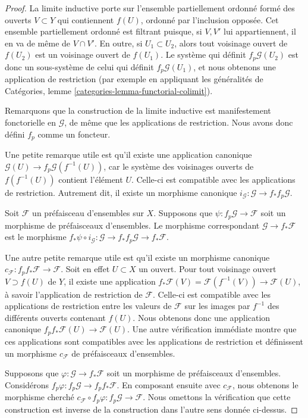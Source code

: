 \begin{proof}
La limite inductive porte sur l'ensemble partiellement ordonné formé des ouverts
$V \subset Y$ qui contiennent $f(U)$, ordonné par l'inclusion opposée.
Cet ensemble partiellement ordonné est filtrant puisque, si $V, V'$ lui appartiennent,
il en va de même de $V \cap V'$. En outre, si
$U_1 \subset U_2$, alors tout voisinage ouvert de $f(U_2)$
est un voisinage ouvert de $f(U_1)$. Le système qui définit
$f_p\mathcal{G}(U_2)$ est donc un sous-système de celui qui définit
$f_p\mathcal{G}(U_1)$, et nous obtenons une application de restriction (par
exemple en appliquant les généralités de Catégories,
lemme \ref{categories-lemma-functorial-colimit}).

\medskip\noindent
Remarquons que la construction de la limite inductive est manifestement fonctorielle
en $\mathcal{G}$, de même que les applications de restriction.
Nous avons donc défini $f_p$ comme un foncteur.

\medskip\noindent
Une petite remarque utile est qu'il existe
une application canonique $\mathcal{G}(U) \to f_p\mathcal{G}(f^{-1}(U))$,
car le système des voisinages ouverts
de $f(f^{-1}(U))$ contient l'élément $U$. Celle-ci est compatible
avec les applications de restriction. Autrement dit, il existe un
morphisme canonique $i_\mathcal{G} : \mathcal{G} \to f_* f_p \mathcal{G}$.

\medskip\noindent
Soit $\mathcal{F}$ un préfaisceau d'ensembles sur $X$.
Supposons que $\psi : f_p\mathcal{G} \to \mathcal{F}$
soit un morphisme de préfaisceaux d'ensembles. Le morphisme correspondant
$\mathcal{G} \to f_*\mathcal{F}$ est le morphisme
$f_*\psi \circ i_\mathcal{G} :
\mathcal{G} \to f_* f_p \mathcal{G} \to f_* \mathcal{F}$.

\medskip\noindent
Une autre petite remarque utile est qu'il existe un
morphisme canonique $c_\mathcal{F} : f_p f_* \mathcal{F} \to \mathcal{F}$.
Soit en effet $U \subset X$ un ouvert.
Pour tout voisinage ouvert $V \supset f(U)$ de $Y$,
il existe une application
$f_*\mathcal{F}(V) = \mathcal{F}(f^{-1}(V))\to \mathcal{F}(U)$,
à savoir l'application de restriction de $\mathcal{F}$. Celle-ci est compatible
avec les applications de restriction entre les valeurs de $\mathcal{F}$
sur les images par $f^{-1}$ des différents ouverts contenant $f(U)$. Nous obtenons donc
une application canonique $f_p f_* \mathcal{F}(U) \to \mathcal{F}(U)$.
Une autre vérification immédiate montre que ces applications sont compatibles
avec les applications de restriction et définissent un morphisme $c_\mathcal{F}$
de préfaisceaux d'ensembles.

\medskip\noindent
Supposons que $\varphi : \mathcal{G} \to f_*\mathcal{F}$
soit un morphisme de préfaisceaux d'ensembles. Considérons $f_p\varphi :
f_p \mathcal{G} \to f_p f_* \mathcal{F}$.
En composant ensuite avec $c_\mathcal{F}$, nous obtenons le morphisme cherché
$c_\mathcal{F} \circ f_p\varphi : f_p\mathcal{G} \to \mathcal{F}$.
Nous omettons la vérification que cette construction est inverse
de la construction dans l'autre sens donnée ci-dessus.
\end{proof}

